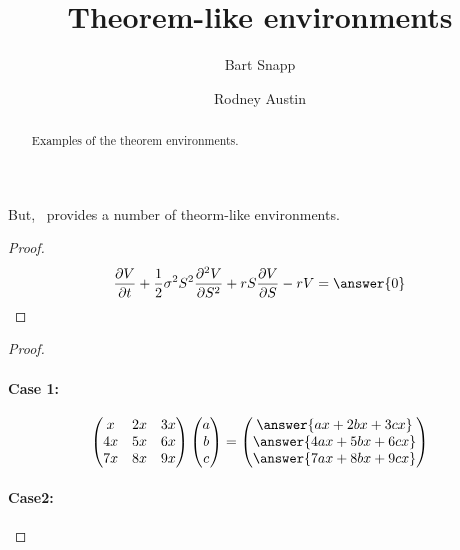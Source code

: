 
\author{Bart Snapp \and Rodney Austin}

\title{Theorem-like environments}



\begin{abstract}
  Examples of the theorem environments.
\end{abstract}
\maketitle


But, \ximera\ provides a number of theorm-like environments.

\begin{theorem}
 \lipsum[1][1-3]
 \begin{proof}
  \lipsum[1][1-3]
\[
\frac{\partial V}{\partial t} + \frac{1}{2} \sigma^2 S^2 \frac{\partial^2 V}{\partial S^2} + r S \frac{\partial V}{\partial S} - r V = \answer{0}
\]
\lipsum[1][1-3]
 \end{proof}
\end{theorem}


\begin{theorem}[My theorem]
  \lipsum[1][1-3]
  \begin{proof}
    \lipsum[1][1-3]
    \paragraph{Case 1:}
    \lipsum[1][1-2]
    \[
\begin{pmatrix}
x & 2x & 3x \\
4x & 5x & 6x \\
7x & 8x & 9x
\end{pmatrix}
\begin{pmatrix}
a \\
b \\
c
\end{pmatrix}
=
\begin{pmatrix}
\answer{ax + 2b x+ 3cx} \\
\answer{4ax + 5bx + 6cx} \\
\answer{7a x+ 8bx + 9cx}
\end{pmatrix}
\]
\lipsum[1][1-1]
\paragraph{Case2:}
\lipsum[1][1-3]


  \end{proof}
\end{theorem}

